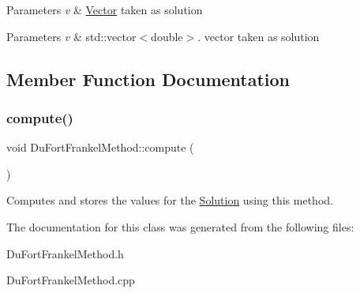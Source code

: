 \begin{DoxyParams}{Parameters}
{\em v} & \hyperlink{class_vector}{Vector} taken as solution \\
\hline
\end{DoxyParams}

\begin{DoxyParams}{Parameters}
{\em v} & std\+::vector$<$double$>$. vector taken as solution \\
\hline
\end{DoxyParams}


\subsection{Member Function Documentation}
\mbox{\label{class_du_fort_frankel_method_a68b9ad88883a71daba4c2fc92355b173}} 
\subsubsection{\texorpdfstring{compute()}{compute()}}
{\footnotesize\ttfamily void Du\+Fort\+Frankel\+Method\+::compute (\begin{DoxyParamCaption}{ }\end{DoxyParamCaption})}

Computes and stores the values for the \hyperlink{class_solution}{Solution} using this method. 

The documentation for this class was generated from the following files\+:\begin{DoxyCompactItemize}
\item 
Du\+Fort\+Frankel\+Method.\+h\item 
Du\+Fort\+Frankel\+Method.\+cpp\end{DoxyCompactItemize}
